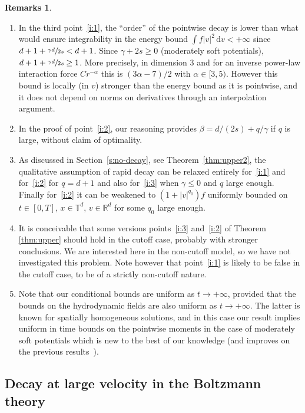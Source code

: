 \documentclass[JEP,XML,SOM,Unicode,NoFloatCountersInSection]{cedram}
\theoremstyle{plain}
\theoremstyle{definition}
\newtheorem{remarks}[thm]{Remarks}
\numberwithin{equation}{section}
\newcommand{\R}{\mathbb R}
\newcommand{\dd} {\, \mathrm{d}}
\begin{document}
\skpt
\begin{remarks}
\begin{enumerate}
\item In the third point~\eqref{i:1}, the ``order'' of the pointwise
decay is lower than what would ensure integrability in the energy
bound $\int f |v|^2 \dd v <+\infty$ since
$d+1+ \sfrac{\gamma d}{2s}<d+1$. Since $\gamma+2s \ge 0$
(moderately soft potentials), $d+1+\sfrac{\gamma d}{2s} \ge
1$. More precisely, in dimension $3$ and for an inverse power-law
interaction force $Cr^{-\alpha}$ this is $(3\alpha-7)/2$ with
$\alpha \in [3,5)$. However this bound is locally (in $v$)
stronger than the energy bound as it is pointwise, and it does not
depend on norms on derivatives through an interpolation argument.

\item In the proof of point~\eqref{i:2}, our reasoning provides
$\beta = d/(2s) + q/\gamma$ if $q$ is large, without claim of
optimality.
\item As discussed in Section~\ref{s:no-decay}, see
Theorem~\ref{thm:upper2}, the qualitative assumption of rapid decay
can be relaxed entirely for~\eqref{i:1} and for~\eqref{i:2} for
$q=d+1$ and also for~\eqref{i:3} when $\gamma \le 0$ and $q$ large
enough. Finally for~\eqref{i:2} it can be weakened to $(1+|v|^{q_0})f$
uniformly bounded on $t \in [0,T]$, $x \in \mathbb{T}^d$, $v \in
\R^d$ for some $q_0$ large enough.
\item It is conceivable that some versions points~\eqref{i:3}
and~\eqref{i:2} of Theorem \ref{thm:upper} should hold in the
cutoff case, probably with stronger conclusions. We are interested
here in the non-cutoff model, so we have not investigated this
problem. Note however that point~\eqref{i:1} is likely to be false
in the cutoff case, \ie to be of a strictly non-cutoff nature.
\item
Note that our conditional bounds are uniform as $t \to +\infty$, provided that the bounds on the hydrodynamic fields are also uniform as $t \to +\infty$. The latter is known for spatially homogeneous solutions, and in this case our result implies uniform in time bounds on the pointwise moments in the case of moderately soft potentials which is new to the best of our knowledge (and improves on the previous results~\cite{MR1233644,MR2359877}).
\end{enumerate}
\end{remarks}

\subsection{Decay at large velocity in the Boltzmann theory}
\end{document}
